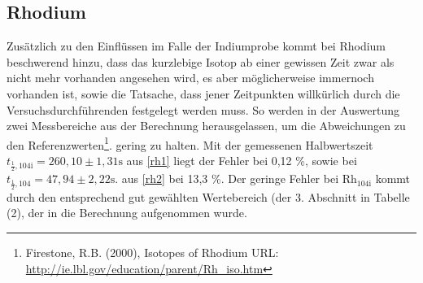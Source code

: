 \subsection{Rhodium}
Zusätzlich zu den Einflüssen im Falle der Indiumprobe kommt bei Rhodium beschwerend hinzu, dass das kurzlebige Isotop ab einer gewissen
Zeit zwar als nicht mehr vorhanden angesehen wird, es aber möglicherweise immernoch vorhanden ist, sowie die Tatsache, dass jener Zeitpunkten
willkürlich durch die Versuchsdurchführenden festgelegt werden muss. So werden in der Auswertung zwei Messbereiche aus der Berechnung
herausgelassen, um die Abweichungen zu den Referenzwerten\footnote[2]{Firestone, R.B. (2000), Isotopes of Rhodium URL: \href{http://ie.lbl.gov/education/parent/Rh\_iso.htm}{http://ie.lbl.gov/education/parent/Rh\_iso.htm}}. gering zu halten. Mit der gemessenen Halbwertszeit $t_{\frac12,\text{104i}} = 260,10 \pm 1,31 \text{s}$ aus \eqref{rh1}
liegt der Fehler bei 0,12 \%, sowie bei $t_{\frac12,\text{104}} = 47,94 \pm 2,22 \text{s}.$ aus \eqref{rh2} bei 13,3 \%. Der geringe Fehler
bei Rh$_{104\text{i}}$ kommt durch den entsprechend gut gewählten Wertebereich (der 3. Abschnitt in Tabelle (2), der 
in die Berechnung aufgenommen wurde.





